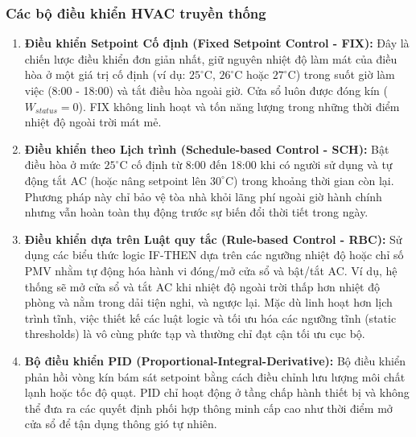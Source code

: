 \documentclass[12pt, a4paper]{article}
\begin{document}
\subsubsection{Các bộ điều khiển HVAC truyền thống}
\begin{enumerate}
    \item \textbf{Điều khiển Setpoint Cố định (Fixed Setpoint Control - FIX):} Đây là chiến lược điều khiển đơn giản nhất, giữ nguyên nhiệt độ làm mát của điều hòa ở một giá trị cố định (ví dụ: $25^\circ\text{C}$, $26^\circ\text{C}$ hoặc $27^\circ\text{C}$) trong suốt giờ làm việc (8:00 - 18:00) và tắt điều hòa ngoài giờ. Cửa sổ luôn được đóng kín ($W_{status} = 0$). FIX không linh hoạt và tốn năng lượng trong những thời điểm nhiệt độ ngoài trời mát mẻ.
    \item \textbf{Điều khiển theo Lịch trình (Schedule-based Control - SCH):} Bật điều hòa ở mức $25^\circ\text{C}$ cố định từ 8:00 đến 18:00 khi có người sử dụng và tự động tắt AC (hoặc nâng setpoint lên $30^\circ\text{C}$) trong khoảng thời gian còn lại. Phương pháp này chỉ bảo vệ tòa nhà khỏi lãng phí ngoài giờ hành chính nhưng vẫn hoàn toàn thụ động trước sự biến đổi thời tiết trong ngày.
    \item \textbf{Điều khiển dựa trên Luật quy tắc (Rule-based Control - RBC):} Sử dụng các biểu thức logic IF-THEN dựa trên các ngưỡng nhiệt độ hoặc chỉ số PMV nhằm tự động hóa hành vi đóng/mở cửa sổ và bật/tắt AC. Ví dụ, hệ thống sẽ mở cửa sổ và tắt AC khi nhiệt độ ngoài trời thấp hơn nhiệt độ phòng và nằm trong dải tiện nghi, và ngược lại. Mặc dù linh hoạt hơn lịch trình tĩnh, việc thiết kế các luật logic và tối ưu hóa các ngưỡng tĩnh (static thresholds) là vô cùng phức tạp và thường chỉ đạt cận tối ưu cục bộ.
    \item \textbf{Bộ điều khiển PID (Proportional-Integral-Derivative):} Bộ điều khiển phản hồi vòng kín bám sát setpoint bằng cách điều chỉnh lưu lượng môi chất lạnh hoặc tốc độ quạt. PID chỉ hoạt động ở tầng chấp hành thiết bị và không thể đưa ra các quyết định phối hợp thông minh cấp cao như thời điểm mở cửa sổ để tận dụng thông gió tự nhiên.
\end{enumerate}
\end{document}
